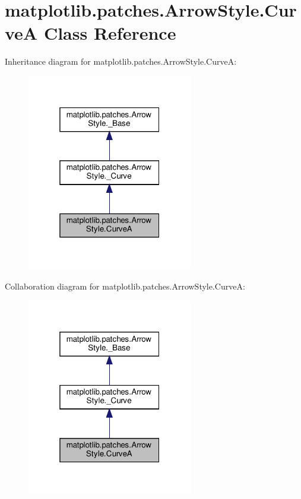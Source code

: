 \hypertarget{classmatplotlib_1_1patches_1_1ArrowStyle_1_1CurveA}{}\section{matplotlib.\+patches.\+Arrow\+Style.\+CurveA Class Reference}
\label{classmatplotlib_1_1patches_1_1ArrowStyle_1_1CurveA}


Inheritance diagram for matplotlib.\+patches.\+Arrow\+Style.\+CurveA\+:
\nopagebreak
\begin{figure}[H]
\begin{center}
\leavevmode
\includegraphics[width=205pt]{classmatplotlib_1_1patches_1_1ArrowStyle_1_1CurveA__inherit__graph}
\end{center}
\end{figure}


Collaboration diagram for matplotlib.\+patches.\+Arrow\+Style.\+CurveA\+:
\nopagebreak
\begin{figure}[H]
\begin{center}
\leavevmode
\includegraphics[width=205pt]{classmatplotlib_1_1patches_1_1ArrowStyle_1_1CurveA__coll__graph}
\end{center}
\end{figure}
